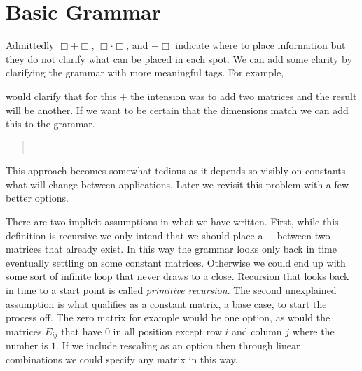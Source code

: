 
\section{Basic Grammar}
Admittedly  $\Box+\Box$, $\Box\cdot \Box$, and $-\Box$ indicate where to place 
information but they do not clarify what can be placed in each spot. 
We can add some clarity by clarifying the grammar with more meaningful tags.
For example, 
\begin{center}
\end{center}
would clarify that for this $+$ the intension was to add two matrices and 
the result will be another.   If we want to be certain that the dimensions 
match we can add this to the grammar.
\begin{quote}
    \\
\end{quote}
This approach becomes somewhat tedious as it depends so visibly on 
constants what will change between applications.  Later we revisit 
this problem with a few better options.


There are two implicit assumptions in what 
we have written.  First, while this definition is recursive we only intend 
that we should place a $+$ between two matrices that already exist.  In this 
way the grammar looks only back in time eventually settling on some constant
matrices.  Otherwise we could end up with some sort of infinite loop that 
never draws to a close.  Recursion that looks back in time to a start point is 
called \emph{primitive recursion}.  The second unexplained assumption is what 
qualifies as a constant matrix, a base case, to start the process off. 
The zero matrix for example would be one option, as would the matrices 
$E_{ij}$ that have $0$ in all position except row $i$ and column $j$ where 
the number is $1$.  If we include rescaling as an option then through 
linear combinations we could specify any matrix in this way.

